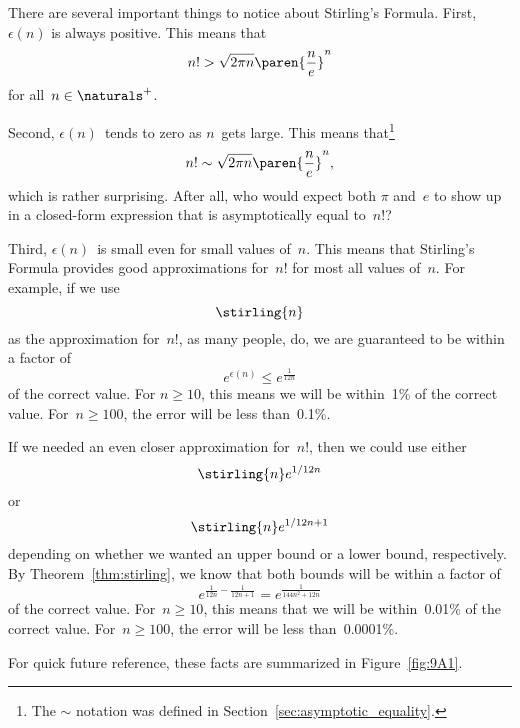 There are several important things to notice about Stirling's
Formula.  First, $\epsilon(n)$ is always positive.  This means that
\begin{equation*}
    n! > \sqrt{2\pi n} \paren{\frac{n}{e}}^n
\end{equation*}
for all~$n \in \naturals^+$.

Second, $\epsilon(n)$~tends to zero as $n$~gets large.  This means
that\footnote{The $\sim$ notation was defined in
  Section~\ref{sec:asymptotic_equality}.}
\begin{equation}\label{eqn:9.28}
    n! \sim \sqrt{2\pi n} \paren{\frac{n}{e}}^n,
\end{equation}
which is rather surprising.  After all, who would expect both $\pi$
and~$e$ to show up in a closed-form expression that is asymptotically
equal to~$n!$?

Third, $\epsilon(n)$~is small even for small values of~$n$.  This
means that Stirling's Formula provides good approximations for~$n!$
for most all values of~$n$.  For example, if we use
\begin{equation*}
    \stirling{n}
\end{equation*}
as the approximation for~$n!$, as many people, do, we are guaranteed
to be within a factor of
\begin{equation*}
    e^{\epsilon(n)} \le e^{\frac{1}{12n}}
\end{equation*}
of the correct value.  For $n \ge 10$, this means we will be
within~1\% of the correct value.  For~$n \ge 100$, the error will be
less than~0.1\%.

If we needed an even closer approximation for~$n!$, then we could use
either
\begin{equation*}
    \stirling{n} e^{1/12n}
\end{equation*}
or
\begin{equation*}
    \stirling{n} e^{1/12n + 1}
\end{equation*}
depending on whether we wanted an upper bound or a lower bound,
respectively.  By Theorem~\ref{thm:stirling}, we know that both bounds
will be within a factor of
\begin{equation*}
    e^{ \frac{1}{12n} - \frac{1}{12n + 1} } = e^{\frac{1}{144n^2 + 12n }}
\end{equation*}
of the correct value.  For~$n \ge 10$, this means that we will be
within~0.01\% of the correct value.  For~$n \ge 100$, the error will
be less than~0.0001\%.

For quick future reference, these facts are summarized in
Figure~\ref{fig:9A1}.

